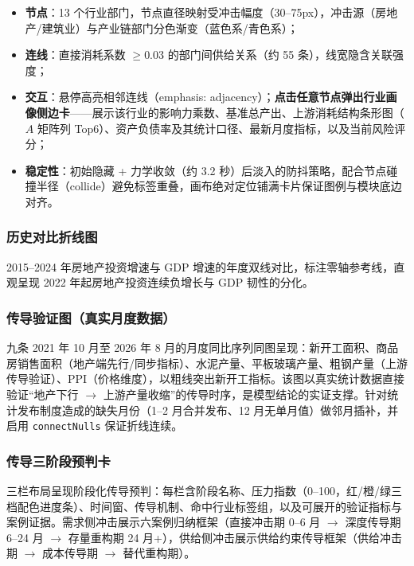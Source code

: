 \documentclass[12pt, a4paper]{ctexart}
\begin{document}
\begin{itemize}[nosep]
  \item \textbf{节点}：13 个行业部门，节点直径映射受冲击幅度（30--75px），冲击源（房地产/建筑业）与产业链部门分色渐变（蓝色系/青色系）；
  \item \textbf{连线}：直接消耗系数 $\geq 0.03$ 的部门间供给关系（约 55 条），线宽隐含关联强度；
  \item \textbf{交互}：悬停高亮相邻连线（emphasis: adjacency）；\textbf{点击任意节点弹出行业画像侧边卡}——展示该行业的影响力乘数、基准总产出、上游消耗结构条形图（$A$ 矩阵列 Top6）、资产负债率及其统计口径、最新月度指标，以及当前风险评分；
  \item \textbf{稳定性}：初始隐藏 + 力学收敛（约 3.2 秒）后淡入的防抖策略，配合节点碰撞半径（collide）避免标签重叠，画布绝对定位铺满卡片保证图例与模块底边对齐。
\end{itemize}

\subsubsection{历史对比折线图}

2015--2024 年房地产投资增速与 GDP 增速的年度双线对比，标注零轴参考线，直观呈现 2022 年起房地产投资连续负增长与 GDP 韧性的分化。

\subsubsection{传导验证图（真实月度数据）}

九条 2021 年 10 月至 2026 年 8 月的月度同比序列同图呈现：新开工面积、商品房销售面积（地产端先行/同步指标）、水泥产量、平板玻璃产量、粗钢产量（上游传导验证）、PPI（价格维度），以粗线突出新开工指标。该图以真实统计数据直接验证``地产下行 $\to$ 上游产量收缩''的传导时序，是模型结论的实证支撑。针对统计发布制度造成的缺失月份（1--2 月合并发布、12 月无单月值）做邻月插补，并启用 \texttt{connectNulls} 保证折线连续。

\subsubsection{传导三阶段预判卡}

三栏布局呈现阶段化传导预判：每栏含阶段名称、压力指数（0--100，红/橙/绿三档配色进度条）、时间窗、传导机制、命中行业标签组，以及可展开的验证指标与案例证据。需求侧冲击展示六案例归纳框架（直接冲击期 0--6 月 $\to$ 深度传导期 6--24 月 $\to$ 存量重构期 24 月+），供给侧冲击展示供给约束传导框架（供给冲击期 $\to$ 成本传导期 $\to$ 替代重构期）。
\end{document}
